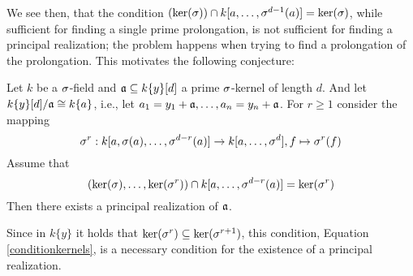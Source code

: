 We see then, that the condition $(\operatorname{ker}(\sigma)) \cap k[a,\ldots,\sigma^{d-1}(a)] = \operatorname{ker}(\sigma)$, while sufficient for finding a single prime prolongation,
is not sufficient for finding a principal realization; the problem happens when trying to find a prolongation of the prolongation. This motivates the following conjecture:

\begin{conj}
Let $k$ be a $\sigma$-field and $\mathfrak{a} \subseteq k\{y\}[d]$ a prime $\sigma$-kernel of length $d$.
And let $k\{y\}[d]/\mathfrak{a} \cong k\{a\}$, i.e., let $a_1 = y_1 + \mathfrak{a} ,\ldots,a_n = y_n + \mathfrak{a}$.
For $r \geq 1$ consider the mapping 
\[ \sigma^r : k[a,\sigma(a),\ldots,\sigma^{d-r}(a)] \rightarrow k[a,\ldots,\sigma^{d}], f \mapsto \sigma^r(f) \]
Assume that
\begin{equation}\label{conditionkernels} (\operatorname{ker}(\sigma),\ldots,\operatorname{ker}(\sigma^r)) \cap k[a,\ldots,\sigma^{d-r}(a)] = \operatorname{ker}(\sigma^r) \end{equation}
Then there exists a principal realization of $\mathfrak{a}$.
\end{conj}

Since in $k\{y\}$ it holds that $\operatorname{ker}(\sigma^r) \subseteq \operatorname{ker}(\sigma^{r+1})$, this condition,
Equation \ref{conditionkernels}, is a necessary condition for the existence of a principal realization. 




